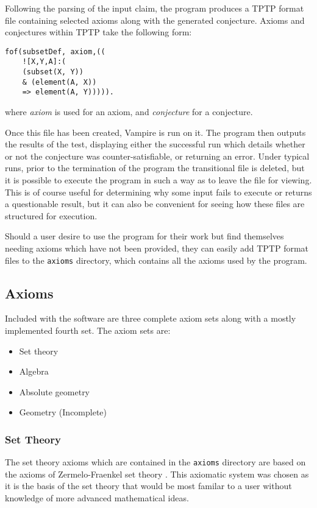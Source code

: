 Following the parsing of the input claim, the program produces a TPTP format file containing selected axioms along with the generated conjecture. Axioms and conjectures within TPTP take the following form:

\begin{lstlisting}
fof(subsetDef, axiom,((
	![X,Y,A]:(
	(subset(X, Y))
	& (element(A, X))
	=> element(A, Y))))).
\end{lstlisting}

\noindent
where \textit{axiom} is used for an axiom, and \textit{conjecture} for a conjecture.

Once this file has been created, Vampire is run on it. The program then outputs the results of the test, displaying either the successful run which details whether or not the conjecture was counter-satisfiable, or returning an error. Under typical runs, prior to the termination of the program the transitional file is deleted, but it is possible to execute the program in such a way as to leave the file for viewing. This is of course useful for determining why some input fails to execute or returns a questionable result, but it can also be convenient for seeing how these files are structured for execution.

Should a user desire to use the program for their work but find themselves needing axioms which have not been provided, they can easily add TPTP format files to the \texttt{axioms} directory, which contains all the axioms used by the program.

\subsection{Axioms}

Included with the software are three complete axiom sets along with a mostly implemented fourth set. The axiom sets are:
\begin{itemize}
	\item Set theory
	\item Algebra
	\item Absolute geometry
	\item Geometry (Incomplete)
\end{itemize}

\subsubsection{Set Theory}

The set theory axioms which are contained in the \texttt{axioms} directory are based on the axioms of Zermelo-Fraenkel set theory \cite{zermelo}. This axiomatic system was chosen as it is the basis of the set theory that would be most familar to a user without knowledge of more advanced mathematical ideas.

